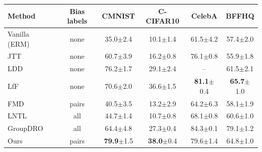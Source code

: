 \begin{tabular}{lccccc}
\toprule
Method & Bias labels & CMNIST & C-CIFAR10 & CelebA & BFFHQ \\
\midrule
Vanilla (ERM) & none & 35.0{\scriptsize$\pm$2.4} & 10.1{\scriptsize$\pm$1.4} & 61.5{\scriptsize$\pm$4.2} & 57.4{\scriptsize$\pm$2.0} \\
JTT~\cite{liu2021jtt} & none & 60.7{\scriptsize$\pm$3.9} & 16.2{\scriptsize$\pm$0.8} & 76.1{\scriptsize$\pm$0.8} & 55.9{\scriptsize$\pm$1.8} \\
LDD~\cite{lee2021ldd} & none & 76.2{\scriptsize$\pm$1.7} & 29.1{\scriptsize$\pm$2.4} & – & 61.5{\scriptsize$\pm$2.1} \\
LfF~\cite{nam2020lff} & none & 70.6{\scriptsize$\pm$2.0} & 36.6{\scriptsize$\pm$1.5} & \textbf{81.1}{\scriptsize$\pm$0.4} & \textbf{65.7}{\scriptsize$\pm$1.0} \\
FMD~\cite{chen2023fmd} & pairs & 40.5{\scriptsize$\pm$3.5} & 13.2{\scriptsize$\pm$2.9} & 64.2{\scriptsize$\pm$6.3} & 58.1{\scriptsize$\pm$1.9} \\
LNTL~\cite{kim2019lntl} & all & 44.7{\scriptsize$\pm$1.4} & 10.7{\scriptsize$\pm$0.8} & 68.1{\scriptsize$\pm$0.8} & 60.6{\scriptsize$\pm$1.0} \\
GroupDRO~\cite{sagawa2020groupdro} & all & 64.4{\scriptsize$\pm$4.8} & 27.3{\scriptsize$\pm$0.4} & 84.3{\scriptsize$\pm$0.1} & 79.1{\scriptsize$\pm$1.2} \\
Ours & pairs & \textbf{79.9}{\scriptsize$\pm$1.5} & \textbf{38.0}{\scriptsize$\pm$0.4} & 79.6{\scriptsize$\pm$1.4} & 64.8{\scriptsize$\pm$1.0} \\
\bottomrule
\end{tabular}
